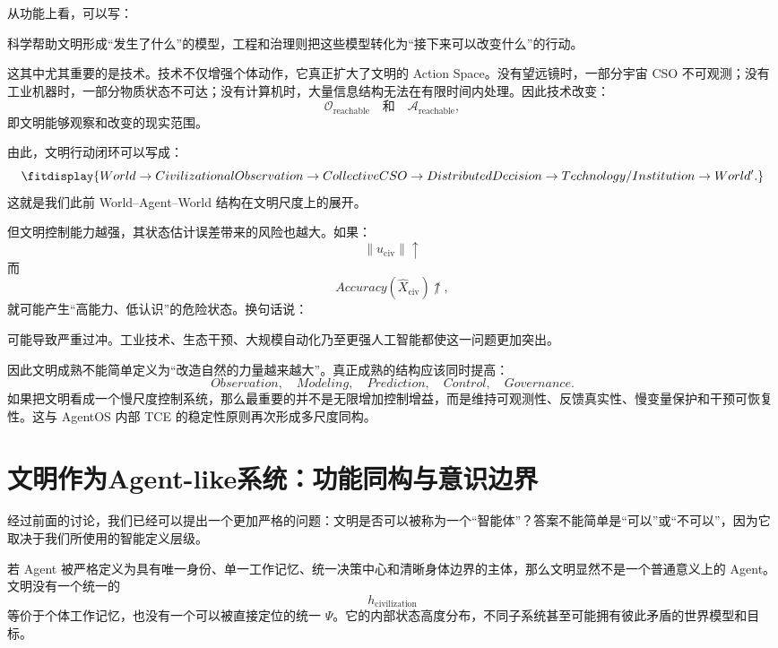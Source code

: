 从功能上看，可以写：
\begin{statementbox}
\centering
{}
\end{statementbox}
科学帮助文明形成“发生了什么”的模型，工程和治理则把这些模型转化为“接下来可以改变什么”的行动。

这其中尤其重要的是技术。技术不仅增强个体动作，它真正扩大了文明的 Action Space。没有望远镜时，一部分宇宙 CSO 不可观测；没有工业机器时，一部分物质状态不可达；没有计算机时，大量信息结构无法在有限时间内处理。因此技术改变：
\[
\mathcal O_{\mathrm{reachable}}
\quad\text{和}\quad
\mathcal A_{\mathrm{reachable}},
\]
即文明能够观察和改变的现实范围。

由此，文明行动闭环可以写成：
\[
\fitdisplay{
World
\rightarrow
CivilizationalObservation
\rightarrow
CollectiveCSO
\rightarrow
DistributedDecision
\rightarrow
Technology/Institution
\rightarrow
World'.
}
\]
这就是我们此前 World--Agent--World 结构在文明尺度上的展开。

但文明控制能力越强，其状态估计误差带来的风险也越大。如果：
\[
\|u_{\mathrm{civ}}\|\uparrow
\]
而
\[
Accuracy(\hat X_{\mathrm{civ}})\not\uparrow,
\]
就可能产生“高能力、低认识”的危险状态。换句话说：
\begin{statementbox}
\centering
{}
\end{statementbox}
可能导致严重过冲。工业技术、生态干预、大规模自动化乃至更强人工智能都使这一问题更加突出。

因此文明成熟不能简单定义为“改造自然的力量越来越大”。真正成熟的结构应该同时提高：
\[
Observation,\quad
Modeling,\quad
Prediction,\quad
Control,\quad
Governance.
\]
如果把文明看成一个慢尺度控制系统，那么最重要的并不是无限增加控制增益，而是维持可观测性、反馈真实性、慢变量保护和干预可恢复性。这与 AgentOS 内部 TCE 的稳定性原则再次形成多尺度同构。

\section{文明作为Agent-like系统：功能同构与意识边界}

经过前面的讨论，我们已经可以提出一个更加严格的问题：文明是否可以被称为一个“智能体”？答案不能简单是“可以”或“不可以”，因为它取决于我们所使用的智能定义层级。

若 Agent 被严格定义为具有唯一身份、单一工作记忆、统一决策中心和清晰身体边界的主体，那么文明显然不是一个普通意义上的 Agent。文明没有一个统一的
\[
h_{\mathrm{civilization}}
\]
等价于个体工作记忆，也没有一个可以被直接定位的统一 $\Psi$。它的内部状态高度分布，不同子系统甚至可能拥有彼此矛盾的世界模型和目标。

